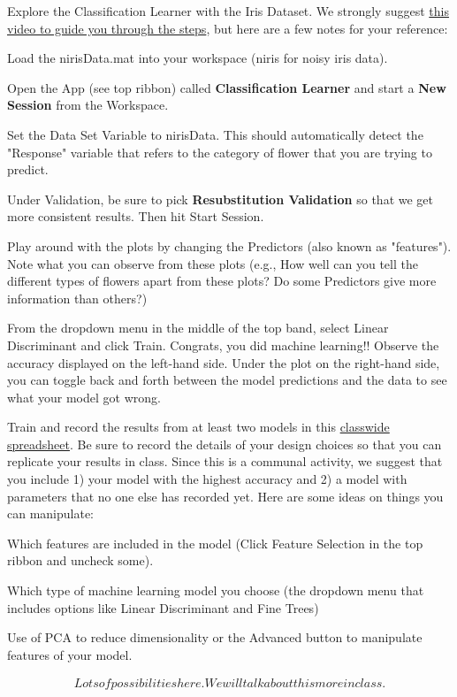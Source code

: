 \documentclass[assignment01_Solutions]{subfiles}
\begin{document}
\ei

\begin{exercise}[(30 minutes)]

\bes 
\item Explore the Classification Learner with the Iris Dataset. We strongly suggest \href{}{this video to guide you through the steps}, but here are a few notes for your reference:
\bi
\item Load the nirisData.mat into your workspace (niris for noisy iris data).
\item Open the App (see top ribbon) called \textbf{Classification Learner} and start a \textbf{New Session} from the Workspace. 
\item Set the Data Set Variable to nirisData. This should automatically detect the "Response" variable that refers to the category of flower that you are trying to predict.
\item Under Validation, be sure to pick \textbf{Resubstitution Validation} so that we get more consistent results. Then hit Start Session.
\item Play around with the plots by changing the Predictors (also known as "features"). Note what you can observe from these plots (e.g., How well can you tell the different types of flowers apart from these plots? Do some Predictors give more information than others?)
\item From the dropdown menu in the middle of the top band, select Linear Discriminant and click Train. Congrats, you did machine learning!! Observe the accuracy displayed on the left-hand side. Under the plot on the right-hand side, you can toggle back and forth between the model predictions and the data to see what your model got wrong.
\ei

\item Train and record the results from at least two models in this \href{https://docs.google.com/spreadsheets/d/1dh4TQbEn25KP0Z0YzHb8IqYpzbTl4e0LC97izIkSEAI/edit?usp=sharing}{classwide spreadsheet}. Be sure to record the details of your design choices so that you can replicate your results in class. Since this is a communal activity, we suggest that you include 1) your model with the highest accuracy and 2) a model with parameters that no one else has recorded yet. Here are some ideas on things you can manipulate:
\bi
\item Which features are included in the model (Click Feature Selection in the top ribbon and uncheck some).
\item Which type of machine learning model you choose (the dropdown menu that includes options like Linear Discriminant and Fine Trees)
\item Use of PCA to reduce dimensionality or the Advanced button to manipulate features of your model.
\ei
\ees

 


\begin{boxedsolution}
\begin{align}
Lots of possibilities here. We will talk about this more in class.
\end{align}
\end{boxedsolution}


\end{exercise}
\end{document}
